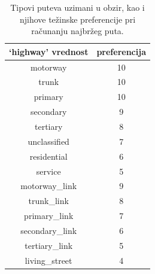 \documentclass[a4paper]{article}
\begin{document}
\begin{table}[h]
    \centering
    \begin{tabular}{c|c}
        `highway' vrednost & preferencija \\
        \hline
        motorway & 10 \\
        trunk & 10 \\
        primary & 10 \\
        secondary & 9 \\
        tertiary & 8 \\
        unclassified & 7 \\
        residential & 6 \\
        service & 5 \\
        motorway\_link & 9 \\
        trunk\_link & 8 \\
        primary\_link & 7 \\
        secondary\_link & 6 \\
        tertiary\_link & 5 \\
        living\_street & 4
    \end{tabular}
    \caption{Tipovi puteva uzimani u obzir, kao i njihove težinske preferencije pri računanju najbržeg puta.}
    \label{tab:speeds}
\end{table}
\end{document}
